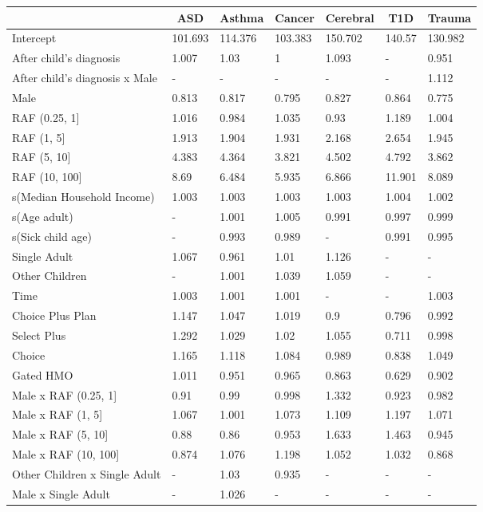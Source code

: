 \begin{table}[!tbp]
\begin{center}
\begin{tabular}{lllllll}
\hline\hline
\multicolumn{1}{l}{}&\multicolumn{1}{c}{ASD}&\multicolumn{1}{c}{Asthma}&\multicolumn{1}{c}{Cancer}&\multicolumn{1}{c}{Cerebral}&\multicolumn{1}{c}{T1D}&\multicolumn{1}{c}{Trauma}\tabularnewline
\hline
Intercept&101.693&114.376&103.383&150.702&140.57&130.982\tabularnewline
After child's diagnosis&1.007&1.03&1&1.093&-&0.951\tabularnewline
After child's diagnosis x Male&-&-&-&-&-&1.112\tabularnewline
Male&0.813&0.817&0.795&0.827&0.864&0.775\tabularnewline
RAF (0.25, 1]&1.016&0.984&1.035&0.93&1.189&1.004\tabularnewline
RAF (1, 5]&1.913&1.904&1.931&2.168&2.654&1.945\tabularnewline
RAF (5, 10]&4.383&4.364&3.821&4.502&4.792&3.862\tabularnewline
RAF (10, 100]&8.69&6.484&5.935&6.866&11.901&8.089\tabularnewline
s(Median Household Income)&1.003&1.003&1.003&1.003&1.004&1.002\tabularnewline
s(Age adult)&-&1.001&1.005&0.991&0.997&0.999\tabularnewline
s(Sick child age)&-&0.993&0.989&-&0.991&0.995\tabularnewline
Single Adult&1.067&0.961&1.01&1.126&-&-\tabularnewline
Other Children&-&1.001&1.039&1.059&-&-\tabularnewline
Time&1.003&1.001&1.001&-&-&1.003\tabularnewline
Choice Plus Plan&1.147&1.047&1.019&0.9&0.796&0.992\tabularnewline
Select Plus&1.292&1.029&1.02&1.055&0.711&0.998\tabularnewline
Choice&1.165&1.118&1.084&0.989&0.838&1.049\tabularnewline
Gated HMO&1.011&0.951&0.965&0.863&0.629&0.902\tabularnewline
Male x RAF (0.25, 1]&0.91&0.99&0.998&1.332&0.923&0.982\tabularnewline
Male x RAF (1, 5]&1.067&1.001&1.073&1.109&1.197&1.071\tabularnewline
Male x RAF (5, 10]&0.88&0.86&0.953&1.633&1.463&0.945\tabularnewline
Male x RAF (10, 100]&0.874&1.076&1.198&1.052&1.032&0.868\tabularnewline
Other Children x Single Adult&-&1.03&0.935&-&-&-\tabularnewline
Male x Single Adult&-&1.026&-&-&-&-\tabularnewline
\hline
\end{tabular}\end{center}
\end{table}
